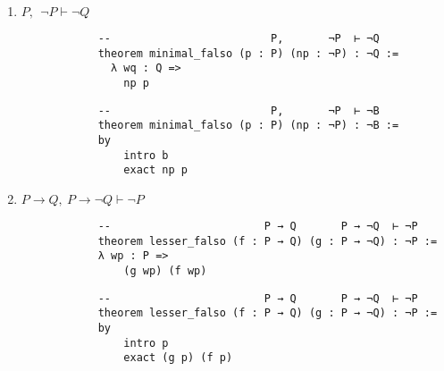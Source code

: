 \documentclass[11pt]{report}
\begin{document}
\begin{enumerate}
\begin{enumerate}
		\newpage
		\item $ P,\ \ \neg  P\vdash  \neg  Q$
		
		\begin{lstlisting}
			--                         P,       ¬P  ⊢ ¬Q
			theorem minimal_falso (p : P) (np : ¬P) : ¬Q :=
			  λ wq : Q =>
				np p
		\end{lstlisting}
		
		\begin{lstlisting}
			--                         P,       ¬P  ⊢ ¬B
			theorem minimal_falso (p : P) (np : ¬P) : ¬B :=
			by
				intro b
				exact np p
		\end{lstlisting}
		
		\newpage
	   \item $ P\rightarrow Q, \  P\rightarrow \lnot Q \vdash \lnot  P$
				
	   \begin{lstlisting}
			--                        P → Q       P → ¬Q  ⊢ ¬P
			theorem lesser_falso (f : P → Q) (g : P → ¬Q) : ¬P :=
			λ wp : P =>
				(g wp) (f wp)
		\end{lstlisting}
		
		\begin{lstlisting}
			--                        P → Q       P → ¬Q  ⊢ ¬P
			theorem lesser_falso (f : P → Q) (g : P → ¬Q) : ¬P :=
			by
				intro p
				exact (g p) (f p)
		\end{lstlisting}
	
	
	\end{enumerate}	


\end{enumerate}	
\end{document}
